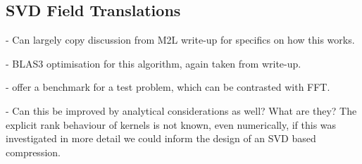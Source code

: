 \subsection{SVD Field Translations}

- Can largely copy discussion from M2L write-up for specifics on how this works.

- BLAS3 optimisation for this algorithm, again taken from write-up.

- offer a benchmark for a test problem, which can be contrasted with FFT.

- Can this be improved by analytical considerations as well? What are they? The explicit rank behaviour of kernels is not known, even numerically, if this was investigated in more detail we could inform the design of an SVD based compression.

